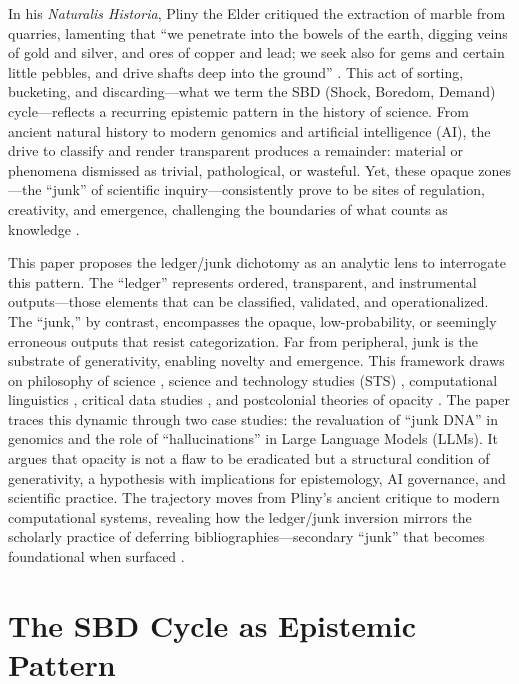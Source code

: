 \documentclass[12pt]{article}
\begin{document}
In his \textit{Naturalis Historia}, Pliny the Elder critiqued the extraction of marble from quarries, lamenting that ``we penetrate into the bowels of the earth, digging veins of gold and silver, and ores of copper and lead; we seek also for gems and certain little pebbles, and drive shafts deep into the ground'' \citep{pliny1855}. This act of sorting, bucketing, and discarding---what we term the SBD (Shock, Boredom, Demand) cycle---reflects a recurring epistemic pattern in the history of science. From ancient natural history to modern genomics and artificial intelligence (AI), the drive to classify and render transparent produces a remainder: material or phenomena dismissed as trivial, pathological, or wasteful. Yet, these opaque zones---the ``junk'' of scientific inquiry---consistently prove to be sites of regulation, creativity, and emergence, challenging the boundaries of what counts as knowledge \citep{douglas1966, haraway1988}.

This paper proposes the ledger/junk dichotomy as an analytic lens to interrogate this pattern. The ``ledger'' represents ordered, transparent, and instrumental outputs---those elements that can be classified, validated, and operationalized. The ``junk,'' by contrast, encompasses the opaque, low-probability, or seemingly erroneous outputs that resist categorization. Far from peripheral, junk is the substrate of generativity, enabling novelty and emergence. This framework draws on philosophy of science \citep{kuhn1962, feyerabend1975}, science and technology studies (STS) \citep{latour1987, jasanoff2004, haraway1988}, computational linguistics \citep{chomsky1957, manning1999}, critical data studies \citep{gitelman2013}, and postcolonial theories of opacity \citep{glissant1997}. The paper traces this dynamic through two case studies: the revaluation of ``junk DNA'' in genomics and the role of ``hallucinations'' in Large Language Models (LLMs). It argues that opacity is not a flaw to be eradicated but a structural condition of generativity, a hypothesis with implications for epistemology, AI governance, and scientific practice. The trajectory moves from Pliny’s ancient critique to modern computational systems, revealing how the ledger/junk inversion mirrors the scholarly practice of deferring bibliographies---secondary ``junk'' that becomes foundational when surfaced \citep{rheinberger1997}.

\section{The SBD Cycle as Epistemic Pattern}
\end{document}
